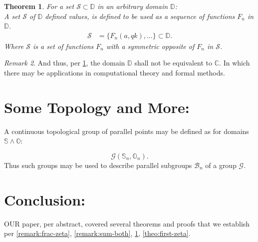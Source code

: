 \documentclass[10pt]{article}
\theoremstyle{plain}
\newtheorem{theorem}{Theorem}[section]
\theoremstyle{definition}
\theoremstyle{remark}
\newtheorem{remark}[theorem]{Remark}
\begin{document}
\begin{theorem}
\label{theo-1}
	For a set $\mathcal{S} \subset \mathbb{D}$ in an arbitrary domain $\mathbb{D}$:\\
	A set $\mathcal{S}$ of $\mathbb{D}$ defined values, is defined to be used as a sequence of functions $F_n$ in $\mathbb{D}$.
	\begin{align*}
		\mathcal{S} &= \{F_n(a, qk), \dots\} \subset \mathbb{D}.
	\end{align*}
	Where $\mathcal{S}$ is a set of functions $F_n$ with a symmetric opposite of $F_n$ in $\mathcal{S}$.
\end{theorem}
\begin{remark}
	And thus, per \ref{theo-1}, the domain $\mathbb{D}$ shall not be equivalent to $\mathbb{C}$. In which there may be applications in computational theory and formal methods.
\end{remark}
\section{Some Topology and More:}
A continuous topological group of parallel points may be defined as for domains $\mathbb{S} \land \mathbb{O}$:

\begin{equation}
	\mathcal{G}(\mathbb{S}_n, \mathbb{O}_n).
\end{equation}
Thus such groups may be used to describe parallel subgroups $\mathcal{B}_n$ of a group $\mathcal{G}$.

\section{Conclusion:}

\lettrine[lines=1, lhang=0.1, loversize=0.2]{O}UR paper, per abstract, covered several theorems and proofs that we establish per \ref{remark:frac-zeta}, \ref{remark:sum-both}, \ref{theo-1}, \ref{theo:first-zeta}.

\nocite{*}




\end{document}
